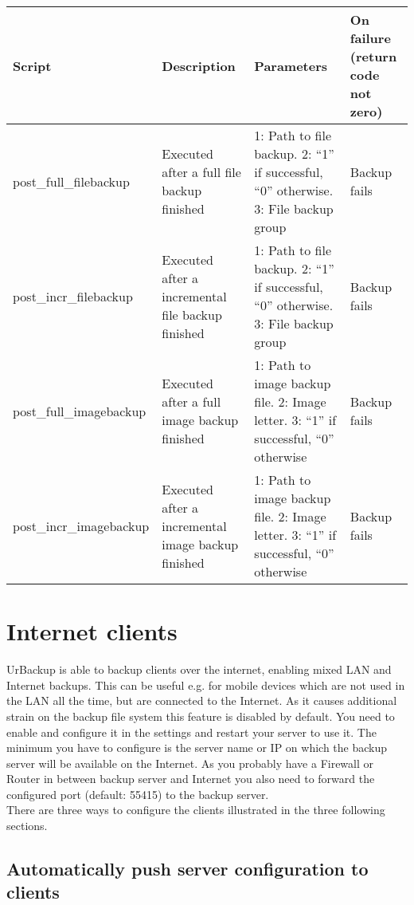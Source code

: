 \documentclass[a4paper,10pt]{article}
\begin{document}
\begin{tabular}{|p{}|p{}|p{}|p{}|}
\hline
Script & Description & Parameters & On failure (return code not zero)\\
\hline\hline
post\_full\_filebackup & Executed after a full file backup finished & 1: Path to file backup. 2: ``1'' if successful, ``0'' otherwise. 3: File backup group & Backup fails\\
\hline
post\_incr\_filebackup & Executed after a incremental file backup finished & 1: Path to file backup. 2: ``1'' if successful, ``0'' otherwise. 3: File backup group & Backup fails\\
\hline
post\_full\_imagebackup & Executed after a full image backup finished & 1: Path to image backup file. 2: Image letter. 3: ``1'' if successful, ``0'' otherwise & Backup fails\\
\hline
post\_incr\_imagebackup & Executed after a incremental image backup finished & 1: Path to image backup file. 2: Image letter. 3: ``1'' if successful, ``0'' otherwise & Backup fails\\
\hline
\end{tabular} 

\section{Internet clients}
\label{sec:internet_clients}

UrBackup is able to backup clients over the internet, enabling mixed LAN and
Internet backups. This can be useful e.g. for mobile devices which are not
used in the LAN all the time, but are connected to the Internet. As it causes
additional strain on the backup file system this feature is disabled by default.
You need to enable and configure it in the settings and restart your server to
use it. The minimum you have to configure is the server name or IP on which
the backup server will be available on the Internet. As you probably have a
Firewall or Router in between backup server and Internet you also need to forward
the configured port (default: 55415) to the backup server.\\
There are three ways to configure the clients illustrated in the three following sections.

\subsection{Automatically push server configuration to clients}
\end{document}
